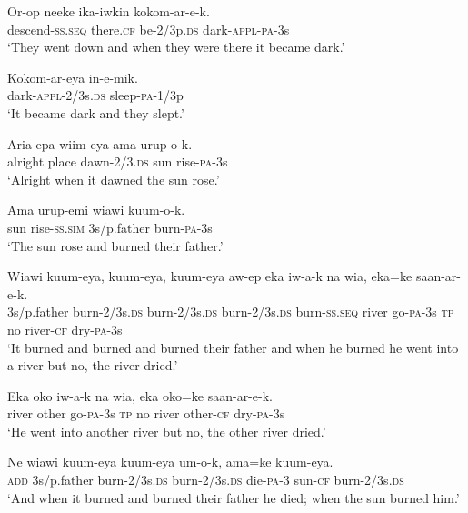 {\ea\label{ex:a:x27}
\gll  Or-op  neeke  ika-iwkin  kokom-ar-e-k. \\
descend-\textsc{ss.seq}  there.\textsc{cf}  be-2/3p.\textsc{ds}  dark-\textsc{appl}-\textsc{pa}-3s \\
\glt ‘They went down and when they were there it became dark.’ \\
\z


\ea\label{ex:a:x28}
\gll  Kokom-ar-eya  in-e-mik. \\
dark-\textsc{appl}-2/3s.\textsc{ds}  sleep-\textsc{pa}-1/3p \\
\glt ‘It became dark and they slept.’ \\
\z


\ea\label{ex:a:x29}
\gll  Aria  epa  wiim-eya  ama  urup-o-k. \\
alright  place  dawn-2/3.\textsc{ds}  sun  rise-\textsc{pa}-3s \\
\glt ‘Alright when it dawned the sun rose.’ \\
\z


\ea\label{ex:a:x30}
\gll  Ama  urup-emi  wiawi  kuum-o-k. \\
sun  rise-\textsc{ss}.\textsc{sim}  3s/p.father  burn-\textsc{pa}-3s \\
\glt ‘The sun rose and burned their father.’ \\
\z


\ea\label{ex:a:x31}
\gll  Wiawi  kuum-eya,  kuum-eya,  kuum-eya  aw-ep                  eka  iw-a-k  na  wia,  eka=ke  saan-ar-e-k. \\
3s/p.father  burn-2/3s.\textsc{ds}  burn-2/3s.\textsc{ds}  burn-2/3s.\textsc{ds}  burn-\textsc{ss.seq}  river  go-\textsc{pa}-3s  \textsc{tp}  no  river-\textsc{cf}  dry-\textsc{pa}-3s \\


\glt ‘It burned and burned and burned their father and when he burned he went into a river but no, the river dried.’ \\
\z


\ea\label{ex:a:x32}
\gll  Eka  oko  iw-a-k  na  wia,  eka  oko=ke  saan-ar-e-k. \\
river  other  go-\textsc{pa}-3s  \textsc{tp}  no  river  other-\textsc{cf}  dry-\textsc{pa}-3s \\
\glt ‘He went into another river but no, the other river dried.’ \\
\z


\ea\label{ex:a:x33}
\gll  Ne  wiawi  kuum-eya  kuum-eya  um-o-k,  ama=ke  kuum-eya. \\
\textsc{add}  3s/p.father  burn-2/3s.\textsc{ds}  burn-2/3s.\textsc{ds}  die-\textsc{pa}-3  sun-\textsc{cf}  burn-2/3s.\textsc{ds} \\
\glt ‘And when it burned and burned their father he died; when the sun burned him.’ \\
\z


}
